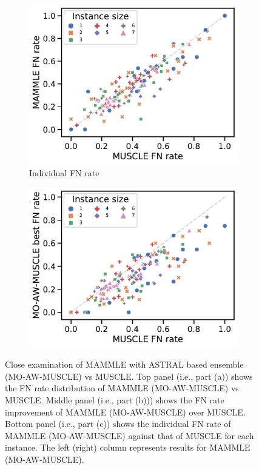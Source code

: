 \begin{figure}[!htbp]
\begin{adjustwidth}{-1.2cm}{}
		\begin{subfigure}{0.40\textwidth} \includegraphics[width=\textwidth]{Figure/delta5-ast} \caption{Individual FN rate}\label{fig:scatter-fn-ast}\end{subfigure}
		\begin{subfigure}{0.40\textwidth} \includegraphics[width=\textwidth]{Figure/delta5-momuscle} 
		\end{subfigure}
	\end{adjustwidth}
	\caption[Close examination of MAMMLE with ASTRAL based ensemble (MO-AW-MUSCLE) vs MUSCLE]{Close examination of MAMMLE with ASTRAL based ensemble (MO-AW-MUSCLE) vs MUSCLE. Top panel (i.e., part (a)) shows the FN rate distribution of MAMMLE (MO-AW-MUSCLE) vs MUSCLE. Middle panel (i.e., part (b))) shows the FN rate improvement of MAMMLE (MO-AW-MUSCLE) over MUSCLE. Bottom panel (i.e., part (c)) shows the individual FN rate of MAMMLE (MO-AW-MUSCLE) against that of MUSCLE for each instance. The left (right) column represents results for MAMMLE (MO-AW-MUSCLE).}
	\label{fig:mammle-result-ast}
\end{figure}


